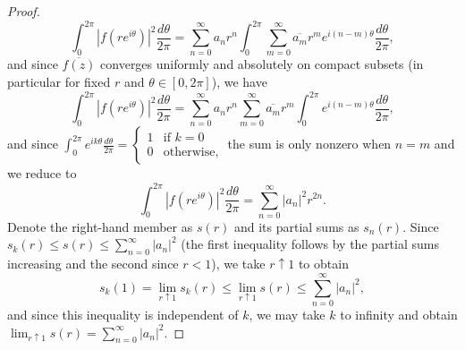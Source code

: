 \documentclass[11pt]{book}
\theoremstyle{definition}
\begin{document}
\begin{proof}
\[
\int_0^{2\pi} |f(re^{i\theta})|^2\frac{d\theta}{2\pi} = \sum_{n=0}^\infty a_nr^n\int_0^{2\pi}\sum_{m=0}^\infty \overline{a_m}r^me^{i(n-m)\theta}\frac{d\theta}{2\pi},
\]
and since $\overline{f(z)}$ converges uniformly and absolutely on compact subsets (in particular for fixed $r$ and $\theta\in [0,2\pi]$), we have
\[
\int_0^{2\pi} |f(re^{i\theta})|^2\frac{d\theta}{2\pi} = \sum_{n=0}^\infty a_nr^n\sum_{m=0}^\infty \overline{a_m}r^m\int_0^{2\pi}e^{i(n-m)\theta}\frac{d\theta}{2\pi},
\]
and since $\int_0^{2\pi}e^{ik\theta}\frac{d\theta}{2\pi} = \begin{cases} 1 & \text{if } k=0 \\ 0 & \text{otherwise,}\end{cases}$ the sum is only nonzero when $n=m$ and we reduce to
\[
\int_0^{2\pi} |f(re^{i\theta})|^2\frac{d\theta}{2\pi} = \sum_{n=0}^\infty |a_n|^2r^{2n}.
\]
Denote the right-hand member as $s(r)$ and its partial sums as $s_n(r)$. Since $s_k(r)\leq s(r) \leq \sum_{n=0}^\infty |a_n|^2$ (the first inequality follows by the partial sums increasing and the second since $r<1$), we take $r\uparrow 1$ to obtain
\[
s_k(1)=\lim_{r\uparrow1}s_k(r) \leq \lim_{r\uparrow 1}s(r) \leq \sum_{n=0}^{\infty} |a_n|^2,
\]
and since this inequality is independent of $k$, we may take $k$ to infinity and obtain $\lim_{r\uparrow 1} s(r) = \sum_{n=0}^\infty |a_n|^2$.
\end{proof}
\end{document}
